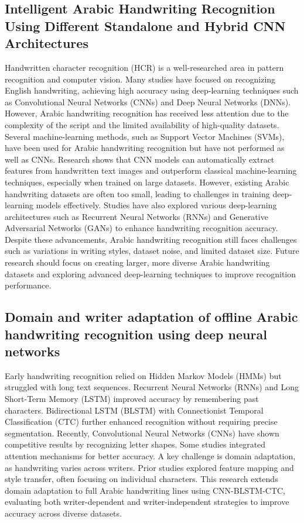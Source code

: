\documentclass{article}
\begin{document}
\subsection{Intelligent Arabic Handwriting Recognition Using Different Standalone and Hybrid CNN Architectures}
Handwritten character recognition (HCR) is a well-researched area in pattern recognition and computer vision. Many studies have focused on recognizing English handwriting, achieving high accuracy using deep-learning techniques such as Convolutional Neural Networks (CNNs) and Deep Neural Networks (DNNs). However, Arabic handwriting recognition has received less attention due to the complexity of the script and the limited availability of high-quality datasets. Several machine-learning methods, such as Support Vector Machines (SVMs), have been used for Arabic handwriting recognition but have not performed as well as CNNs. Research shows that CNN models can automatically extract features from handwritten text images and outperform classical machine-learning techniques, especially when trained on large datasets. However, existing Arabic handwriting datasets are often too small, leading to challenges in training deep-learning models effectively. Studies have also explored various deep-learning architectures such as Recurrent Neural Networks (RNNs) and Generative Adversarial Networks (GANs) to enhance handwriting recognition accuracy. Despite these advancements, Arabic handwriting recognition still faces challenges such as variations in writing styles, dataset noise, and limited dataset size. Future research should focus on creating larger, more diverse Arabic handwriting datasets and exploring advanced deep-learning techniques to improve recognition performance.
\subsection{Domain and writer adaptation of offline Arabic handwriting recognition using deep neural networks}
Early handwriting recognition relied on Hidden Markov Models (HMMs) but struggled with long text sequences. Recurrent Neural Networks (RNNs) and Long Short-Term Memory (LSTM) improved accuracy by remembering past characters. Bidirectional LSTM (BLSTM) with Connectionist Temporal Classification (CTC) further enhanced recognition without requiring precise segmentation.
Recently, Convolutional Neural Networks (CNNs) have shown competitive results by recognizing letter shapes. Some studies integrated attention mechanisms for better accuracy.
A key challenge is domain adaptation, as handwriting varies across writers. Prior studies explored feature mapping and style transfer, often focusing on individual characters. This research extends domain adaptation to full Arabic handwriting lines using CNN-BLSTM-CTC, evaluating both writer-dependent and writer-independent strategies to improve accuracy across diverse datasets.
\end{document}
